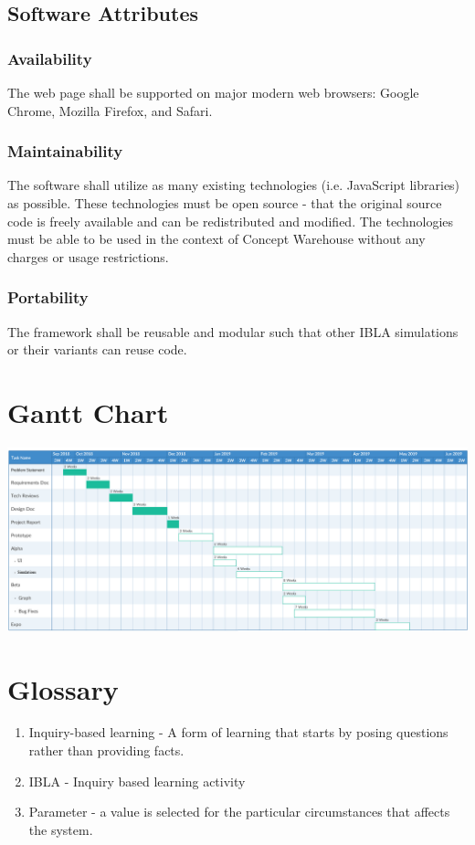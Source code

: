 \documentclass[onecolumn, draftclsnofoot,10pt, compsoc]{IEEEtran}
\begin{document}
\subsection{Software Attributes}
\subsubsection{Availability}
The web page shall be supported on major modern web browsers: Google Chrome, Mozilla Firefox, and Safari.
\subsubsection{Maintainability}
The software shall utilize as many existing technologies (i.e. JavaScript libraries) as possible. These technologies must be open source - that the original source code is freely available and can be redistributed and modified. The technologies must be able to be used in the context of Concept Warehouse without any charges or usage restrictions.
\subsubsection{Portability}
The framework shall be reusable and modular such that other IBLA simulations or their variants can reuse code.

\section{Gantt Chart}
\includegraphics[width=\textwidth]{GanttChart1.png}

\section{Glossary}
\begin{enumerate}
    \item Inquiry-based learning - A form of learning that starts by posing questions rather than providing facts.
    \item IBLA - Inquiry based learning activity
    \item Parameter - a value is selected for the particular circumstances that affects the system. 

\end{enumerate}
\end{document}
